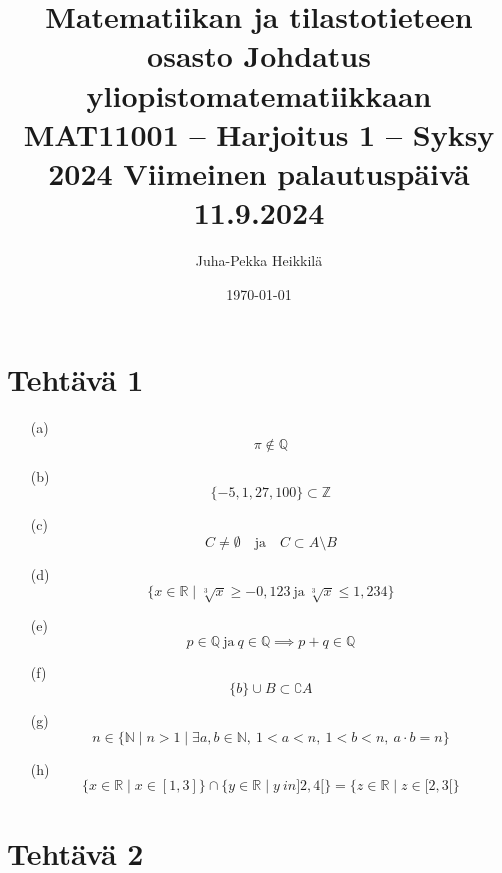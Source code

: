 \documentclass{article}
\begin{document}
	
	\title{Matematiikan ja tilastotieteen osasto
		\newline Johdatus yliopistomatematiikkaan
		\newline  MAT11001 – Harjoitus 1 – Syksy 2024
		\newline Viimeinen palautuspäivä 11.9.2024}
	\author{Juha-Pekka Heikkilä}
	\date{\today}
	
	\maketitle
	
	
	\section{Tehtävä 1}

	
\begin{enumerate}


	\item[(a)]
	\[
	\pi \notin \mathbb{Q}
	\]	
	
	\item[(b)]
	\[
	\{-5, 1, 27, 100\} \subset \mathbb{Z}
	\]

	\item[(c)]
	\[
	C \neq \emptyset \quad \text{ja} \quad C \subset A \setminus B
	\]

	\item[(d)]
	\[
	\{ x \in \mathbb{R} \mid  \sqrt[3]{x} \geq -0,123 \ \text{ja} \  \sqrt[3]{x} \leq 1,234 \}
	\]

	\item[(e)]
	\[
	p \in \mathbb{Q} \ \text{ja} \ q \in \mathbb{Q} \implies p + q \in \mathbb{Q}
	\]

	\item[(f)]
	\[
	\{b\} \cup B \subset \complement A
	\]

	\item[(g)]
	\[
	n \in \{\mathbb{N} \mid n > 1 \mid \exists a, b \in \mathbb{N}, \ 1 < a < n, \ 1 < b < n, \ a \cdot b = n \} 
	\]

	\item[(h)]
	\[
	\{ x \in \mathbb{R} \mid x \in [1, 3]\} \cap \{ y \in \mathbb{R} \mid y\ in ]2, 4[\} = \{ z \in \mathbb{R} \mid z \in [2, 3[\}
	\]

	
\end{enumerate}






	\section{Tehtävä 2}
\end{document}
